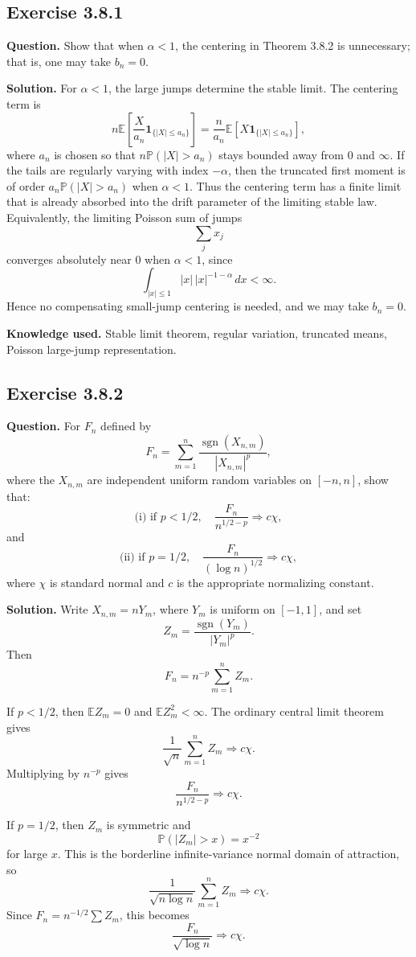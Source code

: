 \documentclass[11pt]{article}
\newcommand{\Prob}{\mathbb{P}}
\newcommand{\E}{\mathbb{E}}
\begin{document}
\subsection*{Exercise 3.8.1}
\textbf{Question.}
Show that when $\alpha<1$, the centering in Theorem 3.8.2 is unnecessary;
that is, one may take $b_n=0$.

\textbf{Solution.}
For $\alpha<1$, the large jumps determine the stable limit.  The
centering term is
\[
  n\E\left[\frac{X}{a_n}\mathbf{1}_{\{|X|\le a_n\}}\right]
  =
  \frac{n}{a_n}\E[X\mathbf{1}_{\{|X|\le a_n\}}],
\]
where $a_n$ is chosen so that $n\Prob(|X|>a_n)$ stays bounded away from
$0$ and $\infty$.  If the tails are regularly varying with index
$-\alpha$, then the truncated first moment is of order
$a_n\Prob(|X|>a_n)$ when $\alpha<1$.  Thus the centering term has a finite
limit that is already absorbed into the drift parameter of the limiting
stable law.  Equivalently, the limiting Poisson sum of jumps
\[
  \sum_j x_j
\]
converges absolutely near $0$ when $\alpha<1$, since
\[
  \int_{|x|\le1}|x|\,|x|^{-1-\alpha}\,dx<\infty.
\]
Hence no compensating small-jump centering is needed, and we may take
$b_n=0$.

\textbf{Knowledge used.}
Stable limit theorem, regular variation, truncated means, Poisson
large-jump representation.

\subsection*{Exercise 3.8.2}
\textbf{Question.}
For $F_n$ defined by
\[
  F_n=\sum_{m=1}^n \frac{\operatorname{sgn}(X_{n,m})}{|X_{n,m}|^p},
\]
where the $X_{n,m}$ are independent uniform random variables on
$[-n,n]$, show that:
\[
  \text{(i) if }p<1/2,\quad
  \frac{F_n}{n^{1/2-p}}\Rightarrow c\chi,
\]
and
\[
  \text{(ii) if }p=1/2,\quad
  \frac{F_n}{(\log n)^{1/2}}\Rightarrow c\chi,
\]
where $\chi$ is standard normal and $c$ is the appropriate normalizing
constant.

\textbf{Solution.}
Write $X_{n,m}=nY_m$, where $Y_m$ is uniform on $[-1,1]$, and set
\[
  Z_m=\frac{\operatorname{sgn}(Y_m)}{|Y_m|^p}.
\]
Then
\[
  F_n=n^{-p}\sum_{m=1}^n Z_m.
\]

If $p<1/2$, then $\E Z_m=0$ and $\E Z_m^2<\infty$.  The ordinary central
limit theorem gives
\[
  \frac{1}{\sqrt n}\sum_{m=1}^n Z_m\Rightarrow c\chi.
\]
Multiplying by $n^{-p}$ gives
\[
  \frac{F_n}{n^{1/2-p}}\Rightarrow c\chi.
\]

If $p=1/2$, then $Z_m$ is symmetric and
\[
  \Prob(|Z_m|>x)=x^{-2}
\]
for large $x$.  This is the borderline infinite-variance normal domain
of attraction, so
\[
  \frac{1}{\sqrt{n\log n}}\sum_{m=1}^n Z_m\Rightarrow c\chi.
\]
Since $F_n=n^{-1/2}\sum Z_m$, this becomes
\[
  \frac{F_n}{\sqrt{\log n}}\Rightarrow c\chi.
\]
\end{document}
